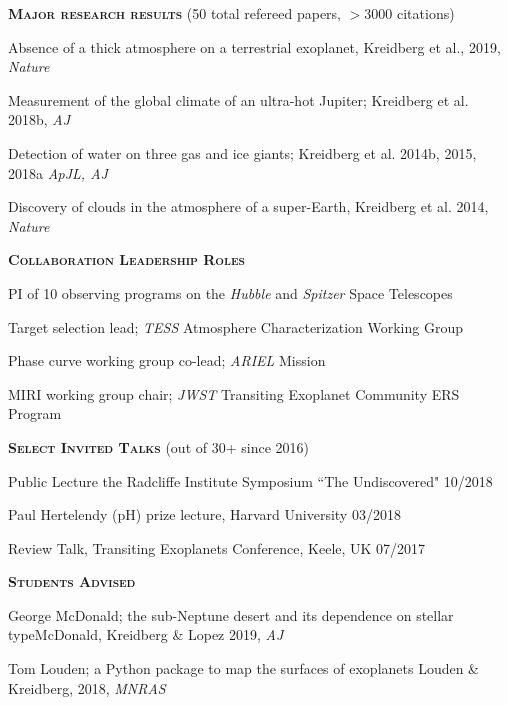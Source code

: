 \documentclass[12pt,letterpaper]{article}
\newcommand\tab[1][1cm]{\hspace*{#1}}
\begin{document}
\textbf{\textsc{Major research results}} (50 total refereed papers, $>$3000 citations) 
\begin{compactitem}[]

\item Absence of a thick atmosphere on a terrestrial exoplanet, Kreidberg et al., 2019, \textit{Nature}

\item Measurement of the global climate of an ultra-hot Jupiter; Kreidberg et al. 2018b, \textit{AJ}

\item Detection of water on three gas and ice giants; Kreidberg et al. 2014b, 2015, 2018a \textit{ApJL, AJ}

\item Discovery of clouds in the atmosphere of a super-Earth, 
Kreidberg et al. 2014, \textit{Nature}
\end{compactitem}
\vspace{5mm}

\textbf{\textsc{Collaboration Leadership Roles}}
\begin{compactitem}[]
\item PI of 10 observing programs on the \emph{Hubble} and \emph{Spitzer} Space Telescopes
\item Target selection lead; \emph{TESS} Atmosphere Characterization Working Group 
\item Phase curve working group co-lead; \emph{ARIEL} Mission 
\item MIRI working group chair; \emph{JWST} Transiting Exoplanet Community ERS Program
\end{compactitem}

\vspace{6mm}
\textbf{\textsc{Select Invited Talks}} (out of 30+ since 2016)
\begin{compactitem}[]
\item {Public Lecture the Radcliffe Institute Symposium ``The Undiscovered" \hfill 10/2018}
\item{Paul Hertelendy (pH) prize lecture, Harvard University \hfill 03/2018}
\item {Review Talk, Transiting Exoplanets Conference, Keele, UK \hfill 07/2017}
\end{compactitem}

\vspace{6mm}
\textbf{\textsc{Students Advised}}
\begin{compactitem}[]
\item George McDonald; the sub-Neptune desert and its dependence on stellar type\newline \tab McDonald, Kreidberg \& Lopez 2019, \textit{AJ}
\item Tom Louden; a Python package to map the surfaces of exoplanets \newline \tab Louden \& Kreidberg, 2018, \textit{MNRAS} 
\end{compactitem}
\end{document}
